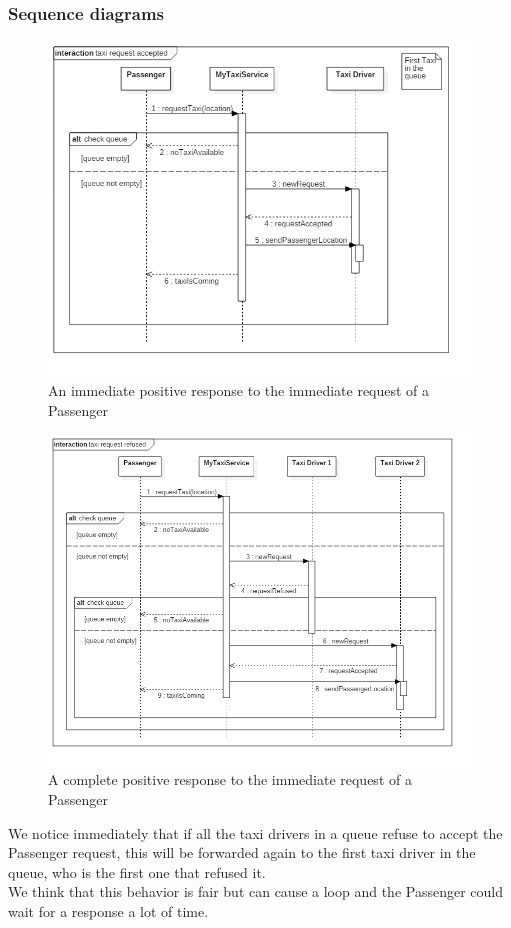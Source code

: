 \subsubsection{Sequence diagrams}
\begin{figure}[H]
\centering
\includegraphics[scale=0.6]{Images/sequence_taxi_request_accepted}
\caption{An immediate positive response to the immediate request of a Passenger}
\label{request_positive_TaxiSD}
\end{figure}

\begin{figure}[H]
\centering
\includegraphics[scale=0.5]{Images/sequence_taxi_request_refused}
\caption{A complete positive response to the immediate request of a Passenger}
\label{request_negative_TaxiSD}
\end{figure}

We notice immediately that if all the taxi drivers in a queue refuse to accept the Passenger request, this will be forwarded again to the first taxi driver in the queue, who is the first one that refused it.
\\ We think that this behavior is fair but can cause a loop and the Passenger could wait for a response a lot of time.\\


